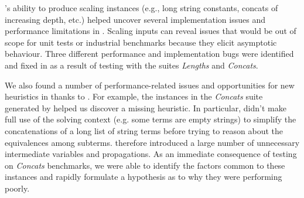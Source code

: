 \fuzzer{}'s ability to produce scaling instances (e.g., long string constants,
concats of increasing depth, etc.) helped uncover several
implementation issues and performance limitations in \us{}. Scaling inputs
can reveal issues that would be out of scope for unit tests or
industrial benchmarks because they elicit asymptotic behaviour. Three different
performance and implementation bugs were identified and fixed in \us{}
as a result of testing with the \fuzzer{} suites
\textit{Lengths} and \textit{Concats}.

We also found a number of performance-related issues and opportunities for
new heuristics in \us{} thanks to \fuzzer{}. For example, the
instances in the \textit{Concats} suite generated by \fuzzer{}
helped us discover a missing heuristic. In particular, \us{} didn't
make full use of the solving context (e.g. some terms are empty
strings) to simplify the concatenations of a long list of string terms
before trying to reason about the equivalences among subterms. \us{}
therefore introduced a large number of unnecessary intermediate
variables and propagations. As an immediate consequence of
testing \us{} on \textit{Concats} benchmarks, we were able to
identify the factors common to these instances and rapidly formulate a
hypothesis as to why they were performing poorly.
